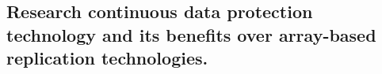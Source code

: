 
\subsection{Research continuous data protection technology and its benefits over array-based replication technologies.} %
\label{sub:research_continuous_data_protection_technology_and_its_benefits_over_array_based_replication_technologies}


